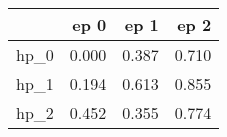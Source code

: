 \begin{tabular}{lrrr}
\toprule
{} &   ep 0 &   ep 1 &   ep 2 \\
\midrule
hp\_0 &  0.000 &  0.387 &  0.710 \\
hp\_1 &  0.194 &  0.613 &  0.855 \\
hp\_2 &  0.452 &  0.355 &  0.774 \\
\bottomrule
\end{tabular}
